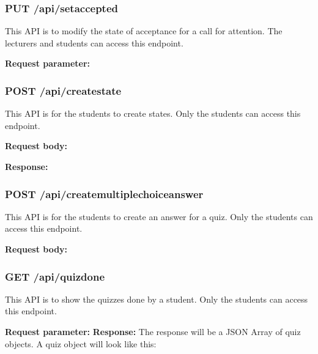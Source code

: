 \documentclass[a4paper, 11pt,openany]{book} %
\begin{document}
\subsubsection{PUT /api/setaccepted}
This API is to modify the state of acceptance for a call for attention. The lecturers and students can access this endpoint. \par
\textbf{Request parameter:}

\subsubsection{POST /api/createstate}
This API is for the students to create states. Only the students can access this endpoint. \par
\textbf{Request body:}

\textbf{Response:}
\subsubsection{POST /api/createmultiplechoiceanswer}
This API is for the students to create an answer for a quiz. Only the students can access this endpoint. \par
\textbf{Request body:}

\subsubsection{GET /api/quizdone}
This API is to show the quizzes done by a student. Only the students can access this endpoint.  \par
\textbf{Request parameter:}
\textbf{Response:}
The response will be a JSON Array of quiz objects. A quiz object will look like this:
\end{document}
